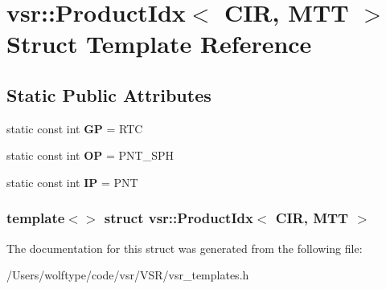 \hypertarget{structvsr_1_1_product_idx_3_01_c_i_r_00_01_m_t_t_01_4}{\section{vsr\-:\-:Product\-Idx$<$ C\-I\-R, M\-T\-T $>$ Struct Template Reference}
\label{structvsr_1_1_product_idx_3_01_c_i_r_00_01_m_t_t_01_4}
}
\subsection*{Static Public Attributes}
\begin{DoxyCompactItemize}
\item 
\hypertarget{structvsr_1_1_product_idx_3_01_c_i_r_00_01_m_t_t_01_4_a5e02bc36ebc6084647e9afe2db9f3756}{static const int {\bfseries G\-P} = R\-T\-C}\label{structvsr_1_1_product_idx_3_01_c_i_r_00_01_m_t_t_01_4_a5e02bc36ebc6084647e9afe2db9f3756}

\item 
\hypertarget{structvsr_1_1_product_idx_3_01_c_i_r_00_01_m_t_t_01_4_afd230a432d430de856fe31136b6d773f}{static const int {\bfseries O\-P} = P\-N\-T\-\_\-\-S\-P\-H}\label{structvsr_1_1_product_idx_3_01_c_i_r_00_01_m_t_t_01_4_afd230a432d430de856fe31136b6d773f}

\item 
\hypertarget{structvsr_1_1_product_idx_3_01_c_i_r_00_01_m_t_t_01_4_a634d25201b7dafe9649658ac88f4ba7d}{static const int {\bfseries I\-P} = P\-N\-T}\label{structvsr_1_1_product_idx_3_01_c_i_r_00_01_m_t_t_01_4_a634d25201b7dafe9649658ac88f4ba7d}

\end{DoxyCompactItemize}
\subsubsection*{template$<$$>$ struct vsr\-::\-Product\-Idx$<$ C\-I\-R, M\-T\-T $>$}



The documentation for this struct was generated from the following file\-:\begin{DoxyCompactItemize}
\item 
/\-Users/wolftype/code/vsr/\-V\-S\-R/vsr\-\_\-templates.\-h\end{DoxyCompactItemize}
